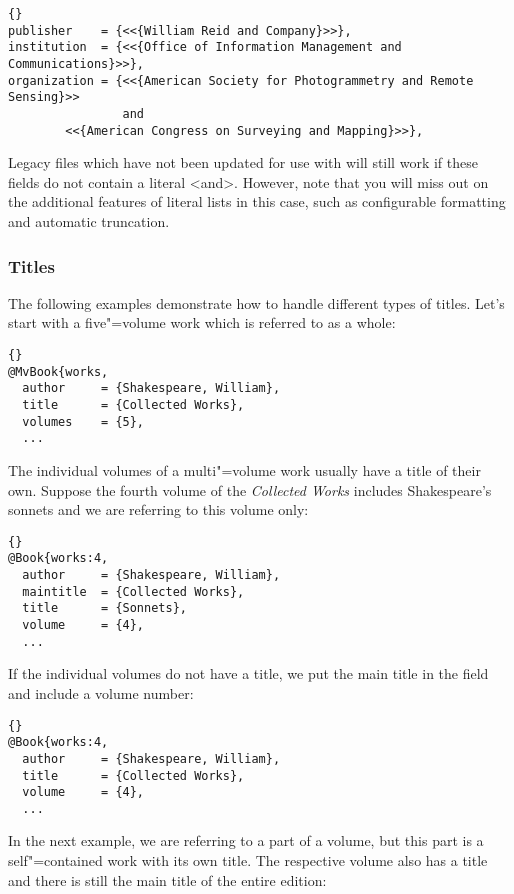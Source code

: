 \documentclass{ltxdockit}[2011/03/25]
\begin{document}
\begin{lstlisting}[style=bibtex]{}
publisher    = {<<{William Reid and Company}>>},
institution  = {<<{Office of Information Management and Communications}>>},
organization = {<<{American Society for Photogrammetry and Remote Sensing}>>
                and
		<<{American Congress on Surveying and Mapping}>>},
\end{lstlisting}
%
Legacy files which have not been updated for use with  will still work if these fields do not contain a literal <and>. However, note that you will miss out on the additional features of literal lists in this case, such as configurable formatting and automatic truncation.

\subsubsection{Titles}
\label{bib:use:ttl}

The following examples demonstrate how to handle different types of titles. Let's start with a five"=volume work which is referred to as a whole:

\begin{lstlisting}[style=bibtex]{}
@MvBook{works,
  author     = {Shakespeare, William},
  title      = {Collected Works},
  volumes    = {5},
  ...
\end{lstlisting}
%
The individual volumes of a multi"=volume work usually have a title of their own. Suppose the fourth volume of the \emph{Collected Works} includes Shakespeare's sonnets and we are referring to this volume only:

\begin{lstlisting}[style=bibtex]{}
@Book{works:4,
  author     = {Shakespeare, William},
  maintitle  = {Collected Works},
  title      = {Sonnets},
  volume     = {4},
  ...
\end{lstlisting}
%
If the individual volumes do not have a title, we put the main title in the  field and include a volume number:

\begin{lstlisting}[style=bibtex]{}
@Book{works:4,
  author     = {Shakespeare, William},
  title      = {Collected Works},
  volume     = {4},
  ...
\end{lstlisting}
%
In the next example, we are referring to a part of a volume, but this part is a self"=contained work with its own title. The respective volume also has a title and there is still the main title of the entire edition:
\end{document}
